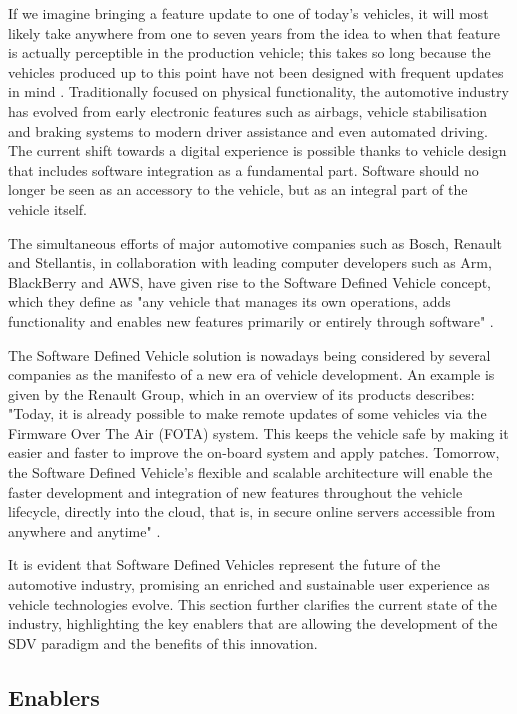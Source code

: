 If we imagine bringing a feature update to one of today's vehicles, it will most likely take anywhere from one to seven years from the idea to when that feature is actually perceptible in the production vehicle; this takes so long because the vehicles produced up to this point have not been designed with frequent updates in mind \cite{SDVBosch}.
Traditionally focused on physical functionality, the automotive industry has evolved from early electronic features such as airbags, vehicle stabilisation and braking systems to modern driver assistance and even automated driving. 
The current shift towards a digital experience is possible thanks to vehicle design that includes software integration as a fundamental part. Software should no longer be seen as an accessory to the vehicle, but as an integral part of the vehicle itself.

The simultaneous efforts of major automotive companies such as Bosch, Renault and Stellantis, in collaboration with leading computer developers such as Arm, BlackBerry and AWS, have given rise to the Software Defined Vehicle concept, which they define as "any vehicle that manages its own operations, adds functionality and enables new features primarily or entirely through software" \cite{blackberrySDV}.

The Software Defined Vehicle solution is nowadays being considered by several companies as the manifesto of a new era of vehicle development. An example is given by the Renault Group, which in an overview of its products describes: "Today, it is already possible to make remote updates of some vehicles via the Firmware Over The Air (FOTA) system. This keeps the vehicle safe by making it easier and faster to improve the on-board system and apply patches. Tomorrow, the Software Defined Vehicle's flexible and scalable architecture will enable the faster development and integration of new features throughout the vehicle lifecycle, directly into the cloud, that is, in secure online servers accessible from anywhere and anytime" \cite{SDVRenault}. 

It is evident that Software Defined Vehicles represent the future of the automotive industry, promising an enriched and sustainable user experience as vehicle technologies evolve. This section further clarifies the current state of the industry, highlighting the key enablers that are allowing the development of the SDV paradigm and the benefits of this innovation.

\subsection{Enablers}

